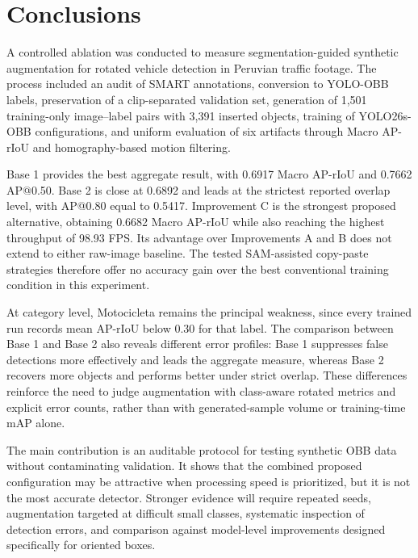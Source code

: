\section{Conclusions}
\label{sec:conclusions}

A controlled ablation was conducted to measure segmentation-guided synthetic augmentation for rotated vehicle detection in Peruvian traffic footage. The process included an audit of SMART annotations, conversion to YOLO-OBB labels, preservation of a clip-separated validation set, generation of 1,501 training-only image--label pairs with 3,391 inserted objects, training of YOLO26s-OBB configurations, and uniform evaluation of six artifacts through Macro AP-rIoU and homography-based motion filtering.

Base 1 provides the best aggregate result, with 0.6917 Macro AP-rIoU and 0.7662 AP@0.50. Base 2 is close at 0.6892 and leads at the strictest reported overlap level, with AP@0.80 equal to 0.5417. Improvement C is the strongest proposed alternative, obtaining 0.6682 Macro AP-rIoU while also reaching the highest throughput of 98.93 FPS. Its advantage over Improvements A and B does not extend to either raw-image baseline. The tested SAM-assisted copy-paste strategies therefore offer no accuracy gain over the best conventional training condition in this experiment.

At category level, Motocicleta remains the principal weakness, since every trained run records mean AP-rIoU below 0.30 for that label. The comparison between Base 1 and Base 2 also reveals different error profiles: Base 1 suppresses false detections more effectively and leads the aggregate measure, whereas Base 2 recovers more objects and performs better under strict overlap. These differences reinforce the need to judge augmentation with class-aware rotated metrics and explicit error counts, rather than with generated-sample volume or training-time mAP alone.

The main contribution is an auditable protocol for testing synthetic OBB data without contaminating validation. It shows that the combined proposed configuration may be attractive when processing speed is prioritized, but it is not the most accurate detector. Stronger evidence will require repeated seeds, augmentation targeted at difficult small classes, systematic inspection of detection errors, and comparison against model-level improvements designed specifically for oriented boxes.
